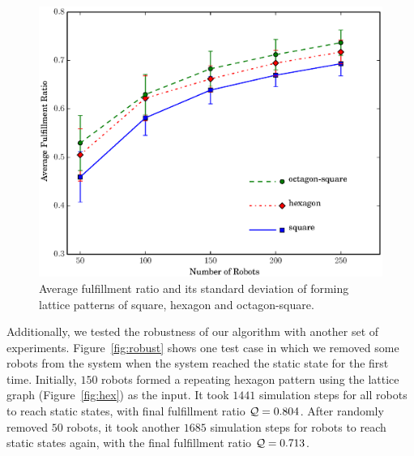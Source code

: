 \begin{figure}
    \centering
   \includegraphics[width=\textwidth]{figs/exp_qual}
    \caption{Average fulfillment ratio and its standard deviation of forming lattice patterns of square, hexagon and octagon-square.} 
    \label{fig:exp-qual}
\end{figure}


Additionally, we tested the robustness of our algorithm with another set of experiments.
%
Figure~\ref{fig:robust} shows one test case in which we removed some robots from the system when the system reached the static state for the first time.
%
Initially, $150$ robots formed a repeating hexagon pattern using the lattice graph (Figure~\ref{fig:hex}) as the input.  
%
It took $1441$ simulation steps for all robots to reach static states, with final fulfillment ratio $\mathcal{Q}=0.804$. 
%
After randomly removed $50$ robots, it took another $1685$ simulation steps for robots to reach static states again, with the final fulfillment ratio $\mathcal{Q}=0.713$. 
%

